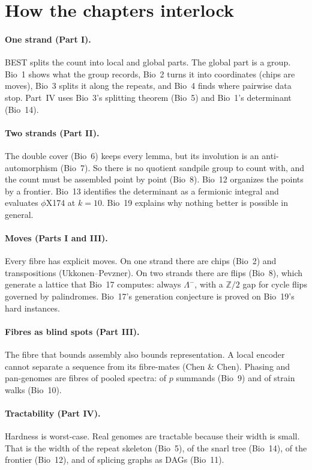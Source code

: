 \documentclass[11pt]{article}
\newcommand{\Lm}{\Lambda^{-}}
\begin{document}
\section*{How the chapters interlock}

\paragraph{One strand (Part I).} BEST splits the count into local and global parts. The global part is
a group. Bio~1 shows what the group records, Bio~2 turns it into coordinates (chips are moves), Bio~3
splits it along the repeats, and Bio~4 finds where pairwise data stop. Part~IV uses Bio~3's splitting
theorem (Bio~5) and Bio~1's determinant (Bio~14).

\paragraph{Two strands (Part II).} The double cover (Bio~6) keeps every lemma, but its involution is an
anti-automorphism (Bio~7). So there is no quotient sandpile group to count with, and the count must be
assembled point by point (Bio~8). Bio~12 organizes the points by a frontier. Bio~13 identifies the
determinant as a fermionic integral and evaluates $\phi$X174 at $k=10$. Bio~19 explains why nothing
better is possible in general.

\paragraph{Moves (Parts I and III).} Every fibre has explicit moves. On one strand there are chips (Bio~2)
and transpositions (Ukkonen--Pevzner). On two strands there are flips (Bio~8), which generate a lattice
that Bio~17 computes: always $\Lm$, with a $\mathbb Z/2$ gap for cycle flips governed by palindromes.
Bio~17's generation conjecture is proved on Bio~19's hard instances.

\paragraph{Fibres as blind spots (Part III).} The fibre that bounds assembly also bounds representation.
A local encoder cannot separate a sequence from its fibre-mates (Chen \& Chen). Phasing and pan-genomes
are fibres of pooled spectra: of $p$ summands (Bio~9) and of strain walks (Bio~10).

\paragraph{Tractability (Part IV).} Hardness is worst-case. Real genomes are tractable because their
width is small. That is the width of the repeat skeleton (Bio~5), of the snarl tree (Bio~14), of the
frontier (Bio~12), and of splicing graphs as DAGs (Bio~11).
\end{document}
